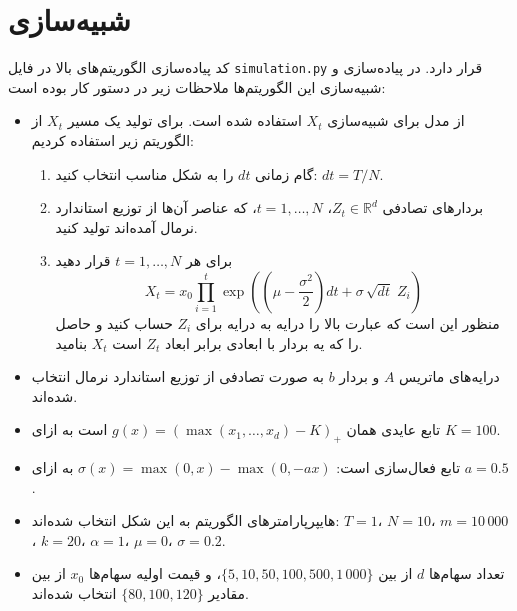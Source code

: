 \documentclass[hidelinks, 11pt]{article}
\begin{document}
\section{شبیه‌سازی}
\label{sec:org98ac9a9}

کد پیاده‌سازی الگوریتم‌های بالا در فایل \texttt{simulation.py} قرار دارد.
در پیاده‌سازی و شبیه‌سازی این الگوریتم‌ها ملاحظات زیر در دستور کار بوده است:

\begin{itemize}
\item از مدل  برای شبیه‌سازی \(X_{t}\) استفاده شده است.
برای تولید یک مسیر \(X_{t}\) از الگوریتم زیر استفاده کردیم:

\begin{enumerate}[1:]
\item گام زمانی \(dt\) را به شکل مناسب انتخاب کنید: \(dt=T/N\).
\item بردارهای تصادفی \(Z_{t}\in\mathbb{R}^{d}\)، \(t=1,\dots,N\)، که
  عناصر آن‌ها از توزیع استاندارد نرمال آمده‌اند تولید کنید.
\item برای هر \(t=1,\dots,N\) قرار دهید
  \begin{equation*}
    X_{t} = x_{0} \prod_{i=1}^{t}
    \exp \left(
      \left( \mu - \frac{\sigma^{2}}{2} \right) dt + \sigma\, \sqrt{dt}\; Z_{i}
    \right)
  \end{equation*}
  منظور این است که عبارت بالا را درایه به درایه برای \(Z_{i}\) حساب
  کنید و حاصل را که یه بردار با ابعادی برابر ابعاد \(Z_{t}\) است
  \(X_{t}\) بنامید.
\end{enumerate}

\item درایه‌های ماتریس \(A\) و بردار \(b\) به صورت تصادفی از توزیع استاندارد
نرمال انتخاب شده‌اند.

\item تابع عایدی همان \(g(x)=(\max(x_{1},\dots,x_{d})-K)_{+}\) است به ازای
\(K=100\).

\item تابع فعال‌سازی  است: \(\sigma(x)=\max(0,x)-\max(0,-ax)\)
به ازای \(a=0.5\).

\item هایپرپارامترهای الگوریتم به این شکل انتخاب شده‌اند: \(T=1\)، \(N=10\)،
\(m=10\,000\)، \(k=20\)، \(\alpha=1\)، \(\mu=0\)، \(\sigma=0.2\).
\item تعداد سهام‌ها \(d\) از بین \(\{5,10,50,100,500,1\,000\}\)، و قیمت اولیه
سهام‌ها \(x_{0}\) از بین مقادیر \(\{80,100,120\}\) انتخاب شده‌اند.
\end{itemize}
\end{document}
